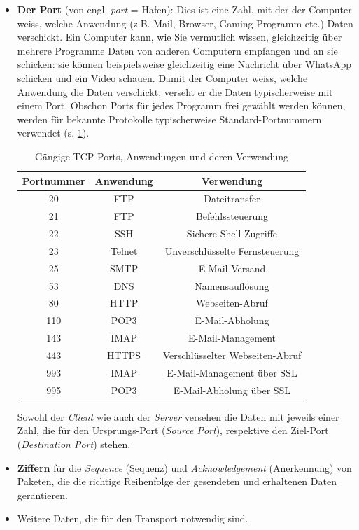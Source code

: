 \begin{itemize}
\item \textbf{Der Port} (von engl. \textit{port} = Hafen): Dies ist eine Zahl, mit der der Computer weiss, welche Anwendung (z.B. Mail, Browser, Gaming-Programm etc.) Daten verschickt. Ein Computer kann, wie Sie vermutlich wissen, gleichzeitig über mehrere Programme Daten von anderen Computern empfangen und an sie schicken: sie können beispielsweise gleichzeitig eine Nachricht über WhatsApp schicken und ein Video schauen. Damit der Computer weiss, welche Anwendung die Daten verschickt, verseht er die Daten typischerweise mit einem Port. Obschon Ports für jedes Programm frei gewählt werden können, werden für bekannte Protokolle typischerweise Standard-Portnummern verwendet (s. \cref{tab:tcp_ports}).
\begin{table}[H]
    \centering
    \begin{tabular}{ccc}
    \toprule
    \textbf{Portnummer} & \textbf{Anwendung} & \textbf{Verwendung} \\
    \midrule
    20 & \acrfull{FTP} & Dateitransfer \\
    21 & \acrfull{FTP} & Befehlssteuerung \\
    22 & \acrfull{SSH} & Sichere Shell-Zugriffe \\
    23 & Telnet & Unverschlüsselte Fernsteuerung \\
    25 & \acrfull{SMTP} & E-Mail-Versand \\
    53 & \acrfull{DNS} & Namensauflösung \\
    80 & \acrfull{HTTP} & Webseiten-Abruf \\
    110 & \acrfull{POP3} & E-Mail-Abholung \\
    143 & \acrfull{IMAP} & E-Mail-Management \\
    443 & \acrfull{HTTPS} & Verschlüsselter Webseiten-Abruf \\
    993 & \acrfull{IMAP} & E-Mail-Management über \acrshort{SSL} \\
    995 & \acrfull{POP3} & E-Mail-Abholung über \acrshort{SSL} \\
    \bottomrule
    \end{tabular}
    \caption{Gängige \gls{TCP}-Ports, Anwendungen und deren Verwendung}
    \label{tab:tcp_ports}
\end{table}
Sowohl der \textit{Client} wie auch der \textit{Server} versehen die Daten mit jeweils einer Zahl, die für den Ursprungs-Port (\textit{Source Port}), respektive den Ziel-Port (\textit{Destination Port}) stehen.
\item \textbf{Ziffern} für die \textit{Sequence} (Sequenz) und \textit{Acknowledgement} (Anerkennung) von Paketen, die die richtige Reihenfolge der gesendeten und erhaltenen Daten gerantieren.
\item Weitere Daten, die für den Transport notwendig sind.
\end{itemize}

